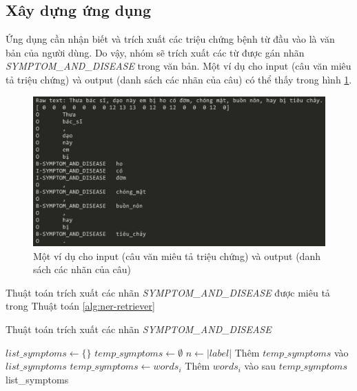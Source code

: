 \documentclass[12pt]{article}
\begin{document}
\subsection{Xây dựng ứng dụng}
Ứng dụng cần nhận biết và trích xuất các triệu chứng bệnh từ đầu vào là văn bản của người dùng. Do vậy, nhóm sẽ trích xuất các từ được gán nhãn \textit{SYMPTOM\_AND\_DISEASE} trong văn bản. Một ví dụ cho input (câu văn miêu tả triệu chứng) và output (danh sách các nhãn của câu) có thể thấy trong hình \ref{fig:example-result}.
\begin{figure}
\centering
\includegraphics[scale=.5]{img/example-result.png}
\caption{Một ví dụ cho input (câu văn miêu tả triệu chứng) và output (danh sách các nhãn của câu)}
\label{fig:example-result}
\end{figure}

Thuật toán trích xuất các nhãn \textit{SYMPTOM\_AND\_DISEASE} được miêu tả trong Thuật toán \ref{alg:ner-retriever}

\begin{algorithm}
\caption{Thuật toán trích xuất các nhãn \textit{SYMPTOM\_AND\_DISEASE}}
\label{alg:ner-retriever}
\begin{algorithmic}
\State $list\_symptoms \gets \{\}$
\State $temp\_symptoms \gets \emptyset$
\State $n \gets |label|$
    \State Thêm $temp\_symptoms$ vào $list\_symptoms$
\EndIf
\State $temp\_symptoms \gets words_i$
\State Thêm $words_i$ vào sau $temp\_symptoms$
\EndIf
\EndFor
\State\Return list\_symptoms
\EndFunction
\end{algorithmic}
\end{algorithm}
\end{document}
